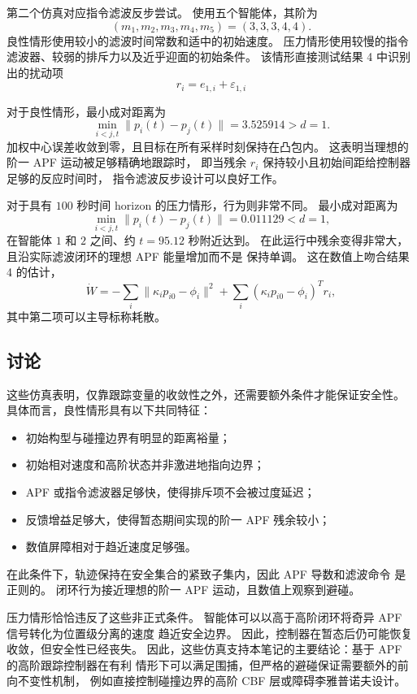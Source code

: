 第二个仿真对应指令滤波反步尝试。
使用五个智能体，其阶为
\[
    (m_1,m_2,m_3,m_4,m_5)=(3,3,3,4,4).
\]
良性情形使用较小的滤波时间常数和适中的初始速度。
压力情形使用较慢的指令滤波器、较弱的排斥力以及近乎迎面的初始条件。
该情形直接测试结果 4 中识别出的扰动项
\[
    r_i=e_{1,i}+\varepsilon_{1,i}
\]

对于良性情形，最小成对距离为
\[
    \min_{i<j,t}\|p_i(t)-p_j(t)\|=3.525914>d=1 .
\]
加权中心误差收敛到零，且目标在所有采样时刻保持在凸包内。
这表明当理想的阶一 APF 运动被足够精确地跟踪时，
即当残余 $r_i$ 保持较小且初始间距给控制器足够的反应时间时，
指令滤波反步设计可以良好工作。

对于具有 $100$ 秒时间 horizon 的压力情形，行为则非常不同。
最小成对距离为
\[
    \min_{i<j,t}\|p_i(t)-p_j(t)\|=0.011129<d=1 ,
\]
在智能体 $1$ 和 $2$ 之间、约 $t=95.12$ 秒附近达到。
在此运行中残余变得非常大，且沿实际滤波闭环的理想 APF 能量增加而不是
保持单调。
这在数值上吻合结果 4 的估计，
\[
    \dot W
    =
    -\sum_i\|\kappa_i p_{i0}-\phi_i\|^2
    +\sum_i(\kappa_i p_{i0}-\phi_i)^T r_i ,
\]
其中第二项可以主导标称耗散。

\subsection{讨论}

这些仿真表明，仅靠跟踪变量的收敛性之外，还需要额外条件才能保证安全性。
具体而言，良性情形具有以下共同特征：
\begin{itemize}
    \item 初始构型与碰撞边界有明显的距离裕量；
    \item 初始相对速度和高阶状态并非激进地指向边界；
    \item APF 或指令滤波器足够快，使得排斥项不会被过度延迟；
    \item 反馈增益足够大，使得暂态期间实现的阶一 APF 残余较小；
    \item 数值屏障相对于趋近速度足够强。
\end{itemize}
在此条件下，轨迹保持在安全集合的紧致子集内，因此 APF 导数和滤波命令
是正则的。
闭环行为接近理想的阶一 APF 运动，且数值上观察到避碰。

压力情形恰恰违反了这些非正式条件。
智能体可以以高于高阶闭环将奇异 APF 信号转化为位置级分离的速度
趋近安全边界。
因此，控制器在暂态后仍可能恢复收敛，但安全性已经丧失。
因此，这些仿真支持本笔记的主要结论：基于 APF 的高阶跟踪控制器在有利
情形下可以满足围捕，但严格的避碰保证需要额外的前向不变性机制，
例如直接控制碰撞边界的高阶 CBF 层或障碍李雅普诺夫设计。